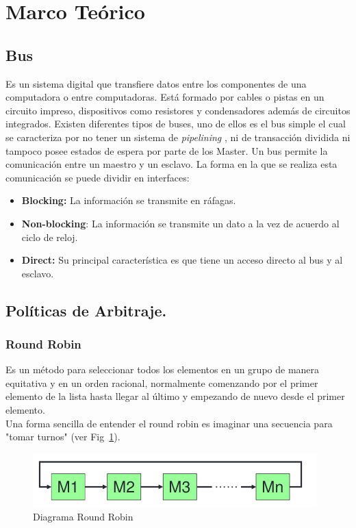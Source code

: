 \documentclass[twocolumn]{IEEEtran}
\begin{document}
\section{Marco Teórico}
\subsection{Bus}
\noindent
Es un sistema digital que transfiere datos entre los componentes de una computadora o entre computadoras. Está formado por cables o pistas en un circuito impreso, dispositivos como resistores y condensadores además de circuitos integrados\cite{page1}. Existen diferentes tipos de buses, uno de ellos es el bus simple el cual se caracteriza por no tener un sistema de \textit{pipelining} , ni de transacción dividida ni tampoco posee estados de espera por parte de los Master. Un bus permite la comunicación entre un maestro y un esclavo. La forma en la que se realiza esta comunicación se puede dividir en interfaces:
\begin{itemize}
 \item \textbf{Blocking:} La información se transmite en ráfagas.
 \item \textbf{Non-blocking}: La información se transmite un dato a la vez de acuerdo al ciclo de reloj.
 \item \textbf{Direct:} Su principal característica es que tiene un acceso directo al bus y al esclavo.
\end{itemize}

\subsection{Políticas de Arbitraje.}
\subsubsection{Round Robin}
\noindent
Es un método para seleccionar todos los elementos en un grupo de manera equitativa y en un orden racional, normalmente comenzando por el primer elemento de la lista hasta llegar al último y empezando de nuevo desde el primer elemento.\\
Una forma sencilla de entender el round robin es imaginar una secuencia para "tomar turnos" (ver Fig~\ref{fig7}).
\begin{figure}
  \centering
 \includegraphics[scale=0.5]{fig7.png}
 \caption{Diagrama Round Robin}
 \label{fig7}
\end{figure}
\end{document}
